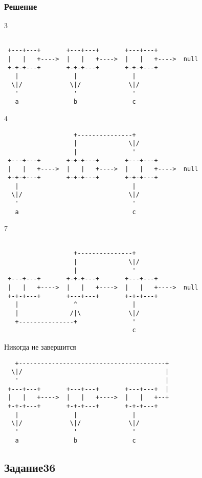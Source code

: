 \documentclass[10pt,a4paper]{article}
\begin{document}
\subsubsection*{Решение}
3
\begin{lstlisting}

 +---+---+       +---+---+       +---+---+
 |   |   +---->  |   |   +---->  |   |   +---->  null
 +-+-+---+       +-+-+---+       +-+-+---+
   |               |               |
  \|/             \|/             \|/
   '               '               '
   a               b               c

\end{lstlisting}
4
\begin{lstlisting}
                   +---------------+
                   |              \|/
                   |               '
 +---+---+       +-+-+---+       +---+---+
 |   |   +---->  |   |   +---->  |   |   +---->  null
 +-+-+---+       +-+-+---+       +-+-+---+
   |                               |
  \|/                             \|/
   '                               '
   a                               c

\end{lstlisting}
7
\begin{lstlisting}

                   +---------------+
                   |              \|/
                   |               '
 +---+---+       +-+-+---+       +---+---+
 |   |   +---->  |   |   +---->  |   |   +---->  null
 +-+-+---+       +---+---+       +-+-+---+
   |               ^               |
   |              /|\             \|/
   +---------------+               '
                                   c

\end{lstlisting}
Никогда не завершится
\begin{lstlisting}
   +----------------------------------------+
  \|/                                       |
   '                                        |
 +---+---+       +---+---+       +---+---+  |
 |   |   +---->  |   |   +---->  |   |   +--+
 +-+-+---+       +-+-+---+       +-+-+---+
   |               |               |
  \|/             \|/             \|/
   '               '               '
   a               b               c

\end{lstlisting}



\subsection*{Задание36}
\end{document}
